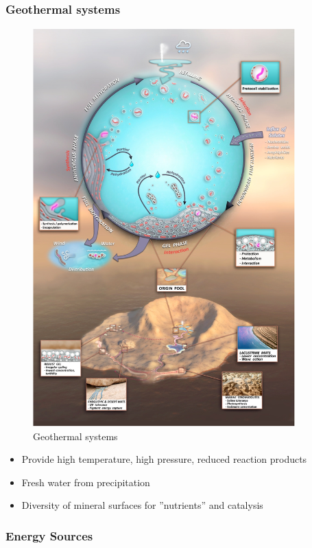 \documentclass[]{article}
\begin{document}
  
\subsubsection{Geothermal systems}
\begin{figure}[h!]
	\caption{Geothermal systems \cite{damer2016field}}
	\includegraphics[width=0.9\textwidth]{GeothermalSystems}
\end{figure}

\begin{itemize}
	\item Provide high 	temperature, high
	pressure, reduced	reaction products
	\item Fresh water from 	precipitation
	\item Diversity of mineral	surfaces for ”nutrients” and catalysis
\end{itemize}

\subsubsection{Energy Sources}
\end{document}
